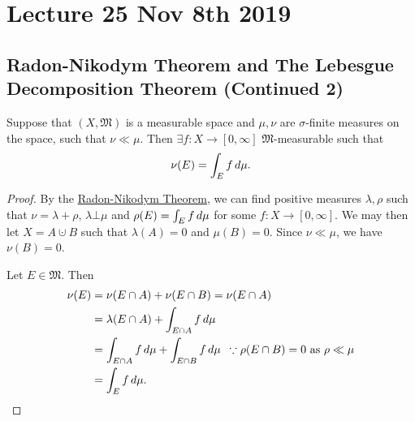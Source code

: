 \documentclass[notoc,notitlepage]{tufte-book}
\begin{document}


\chapter{Lecture 25 Nov 8th 2019}%
\label{chp:lecture_25_nov_8th_2019}

\section{Radon-Nikodym Theorem and The Lebesgue Decomposition Theorem (Continued 2)}%
\label{sec:radon_nikodym_theorem_and_the_lebesgue_decomposition_theorem_continued_2}

\begin{crly}\label{crly:a_corollary_to_radon_nikodym}
  Suppose that $(X, \mathfrak{M})$ is a measurable space and $\mu, \nu$ are
  $\sigma$-finite measures on the space, such that $\nu \ll \mu$.
  Then $\exists f : X \to [0, \infty]$ $\mathfrak{M}$-measurable such that
  \begin{equation*}
    \nu(E) = \int_{E} f \mathop{}\!d{\mu}.
  \end{equation*}
\end{crly}

\begin{proof}
  By the \hyperref[thm:radon_nikodym_theorem]{Radon-Nikodym Theorem}, we can
  find positive measures $\lambda, \rho$ such that $\nu = \lambda + \rho$,
  $\lambda \bot \mu$ and $\rho(E) = \int_{E} f \mathop{}\!d{\mu}$ for some $f : X \to
  [0, \infty]$.
  We may then let $X = A \cupdot B$ such that $\lambda(A) = 0$ and $\mu(B) = 0$.
  Since $\nu \ll \mu$, we have $\nu(B) = 0$.

  Let $E \in \mathfrak{M}$. Then
  \begin{align*}
    \nu(E) &= \nu(E \cap A) + \nu(E \cap B) = \nu(E \cap A) \\
           &= \lambda(E \cap A) + \int_{E \cap A} f \mathop{}\!d{\mu} \\
           &= \int_{E \cap A} f \mathop{}\!d{\mu} + \int_{E \cap B} f \mathop{}\!d{\mu} \enspace
            \because \rho(E \cap B) = 0 \text{ as } \rho \ll \mu \\
           &= \int_{E} f \mathop{}\!d{\mu}.
  \end{align*}
\end{proof}
\end{document}
